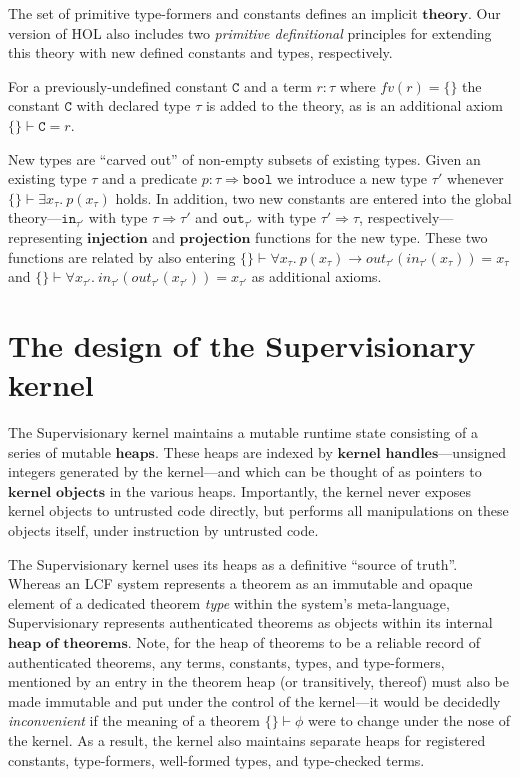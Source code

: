 \documentclass[a4paper, 10pt]{article}
\newcommand{\deffont}[1]{\ensuremath{\textbf{#1}}}
\newcommand{\fall}[1]{\forall{#1}.\ }
\newcommand{\xsts}[1]{\exists{#1}.\ }
\begin{document}
The set of primitive type-formers and constants defines an implicit \deffont{theory}.
Our version of HOL also includes two \emph{primitive definitional} principles for extending this theory with new defined constants and types, respectively.

For a previously-undefined constant $\mathtt{C}$ and a term $r : \tau$ where $fv(r) = \{\}$ the constant $\mathtt{C}$ with declared type $\tau$ is added to the theory, as is an additional axiom $\{\} \vdash \mathtt{C} = r$.

New types are ``carved out'' of non-empty subsets of existing types.
Given an existing type $\tau$ and a predicate $p : \tau \Rightarrow \mathtt{bool}$ we introduce a new type $\tau'$ whenever $\{\} \vdash \xsts{x_\tau}p(x_\tau)$ holds.
In addition, two new constants are entered into the global theory---$\mathtt{in}_{\tau'}$ with type $\tau \Rightarrow \tau'$ and $\mathtt{out}_{\tau'}$ with type $\tau' \Rightarrow \tau$, respectively---representing \deffont{injection} and \deffont{projection} functions for the new type.
These two functions are related by also entering $\{\} \vdash \fall{x_\tau}p(x_\tau) \longrightarrow out_{\tau'}(in_{\tau'}(x_\tau)) = x_\tau$ and $\{\} \vdash \fall{x_{\tau'}}in_{\tau'}(out_{\tau'}(x_{\tau'})) = x_{\tau'}$ as additional axioms.

\section{The design of the Supervisionary kernel}
\label{sect.design.supervisionary.kernel}

The Supervisionary kernel maintains a mutable runtime state consisting of a series of mutable \deffont{heaps}.
These heaps are indexed by \deffont{kernel handles}---unsigned integers generated by the kernel---and which can be thought of as pointers to \deffont{kernel objects} in the various heaps.
Importantly, the kernel never exposes kernel objects to untrusted code directly, but performs all manipulations on these objects itself, under instruction by untrusted code.

The Supervisionary kernel uses its heaps as a definitive ``source of truth''.
Whereas an LCF system represents a theorem as an immutable and opaque element of a dedicated theorem \emph{type} within the system's meta-language, Supervisionary represents authenticated theorems as objects within its internal \deffont{heap of theorems}.
Note, for the heap of theorems to be a reliable record of authenticated theorems, any terms, constants, types, and type-formers, mentioned by an entry in the theorem heap (or transitively, thereof) must also be made immutable and put under the control of the kernel---it would be decidedly \emph{inconvenient} if the meaning of a theorem $\{ \} \vdash \phi$ were to change under the nose of the kernel.
As a result, the kernel also maintains separate heaps for registered constants, type-formers, well-formed types, and type-checked terms.
\end{document}
